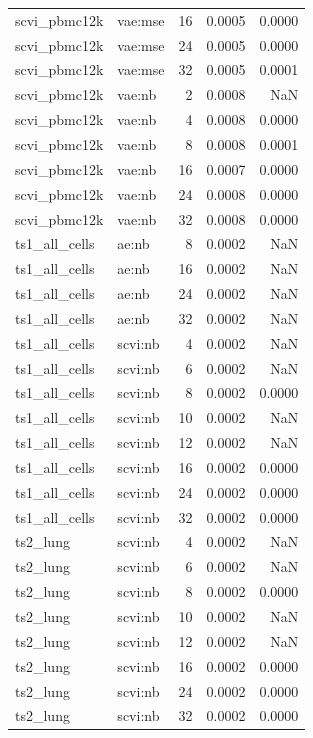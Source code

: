 \begin{tabular}{llrrr}
scvi\_pbmc12k & vae:mse & 16 & 0.0005 & 0.0000 \\
scvi\_pbmc12k & vae:mse & 24 & 0.0005 & 0.0000 \\
scvi\_pbmc12k & vae:mse & 32 & 0.0005 & 0.0001 \\
scvi\_pbmc12k & vae:nb & 2 & 0.0008 & NaN \\
scvi\_pbmc12k & vae:nb & 4 & 0.0008 & 0.0000 \\
scvi\_pbmc12k & vae:nb & 8 & 0.0008 & 0.0001 \\
scvi\_pbmc12k & vae:nb & 16 & 0.0007 & 0.0000 \\
scvi\_pbmc12k & vae:nb & 24 & 0.0008 & 0.0000 \\
scvi\_pbmc12k & vae:nb & 32 & 0.0008 & 0.0000 \\
ts1\_all\_cells & ae:nb & 8 & 0.0002 & NaN \\
ts1\_all\_cells & ae:nb & 16 & 0.0002 & NaN \\
ts1\_all\_cells & ae:nb & 24 & 0.0002 & NaN \\
ts1\_all\_cells & ae:nb & 32 & 0.0002 & NaN \\
ts1\_all\_cells & scvi:nb & 4 & 0.0002 & NaN \\
ts1\_all\_cells & scvi:nb & 6 & 0.0002 & NaN \\
ts1\_all\_cells & scvi:nb & 8 & 0.0002 & 0.0000 \\
ts1\_all\_cells & scvi:nb & 10 & 0.0002 & NaN \\
ts1\_all\_cells & scvi:nb & 12 & 0.0002 & NaN \\
ts1\_all\_cells & scvi:nb & 16 & 0.0002 & 0.0000 \\
ts1\_all\_cells & scvi:nb & 24 & 0.0002 & 0.0000 \\
ts1\_all\_cells & scvi:nb & 32 & 0.0002 & 0.0000 \\
ts2\_lung & scvi:nb & 4 & 0.0002 & NaN \\
ts2\_lung & scvi:nb & 6 & 0.0002 & NaN \\
ts2\_lung & scvi:nb & 8 & 0.0002 & 0.0000 \\
ts2\_lung & scvi:nb & 10 & 0.0002 & NaN \\
ts2\_lung & scvi:nb & 12 & 0.0002 & NaN \\
ts2\_lung & scvi:nb & 16 & 0.0002 & 0.0000 \\
ts2\_lung & scvi:nb & 24 & 0.0002 & 0.0000 \\
ts2\_lung & scvi:nb & 32 & 0.0002 & 0.0000 \\
\bottomrule
\end{tabular}
